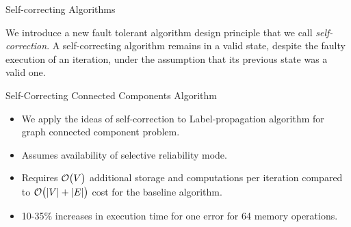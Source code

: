 
\begin{alertblock}{Self-correcting Algorithms}

We introduce a new fault tolerant algorithm design principle that we call \emph{self-correction}. A self-correcting algorithm remains in a valid state, despite the faulty execution of an iteration, under the assumption that its previous state was a valid one. 
\end{alertblock}
\pause
\begin{exampleblock}{Self-Correcting Connected Components Algorithm}
\begin{itemize}
\item We apply the ideas of self-correction to Label-propagation algorithm for graph connected component problem.
\item Assumes availability of selective reliability mode.
\item Requires $\operatorname{\mathcal{O}}\bigl({V}\bigr)$ additional storage and computations per iteration compared to $\operatorname{\mathcal{O}}\bigl({|V|+|E|}\bigr)$ cost for the baseline algorithm.
\item 10-35\%  increases in execution time for one error for 64 memory operations.
\end{itemize}
\end{exampleblock}

\lyxframeend{}